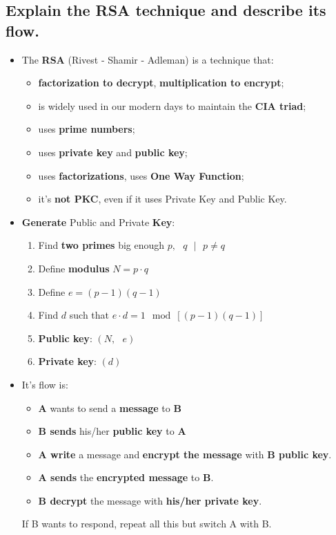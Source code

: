\documentclass[9pt, letterpaper]{article}
\begin{document}
\subsection{Explain the RSA technique and describe its flow.}
\begin{itemize}
	\item The \textbf{RSA} (Rivest - Shamir - Adleman) is a technique that:
	\begin{itemize}
		\item \textbf{factorization to decrypt}, \textbf{multiplication to encrypt};
		\item is widely used in our modern days to maintain the \textbf{CIA triad};
		\item uses \textbf{prime numbers};
		\item uses \textbf{private key} and \textbf{public key};
		\item uses \textbf{factorizations}, uses \textbf{One Way Function};
		\item it's \textbf{not PKC}, even if it uses Private Key and Public Key.
	\end{itemize}
	\item \textbf{Generate} Public and Private \textbf{Key}:
	\begin{enumerate}
		\item Find \textbf{two primes} big enough $p,\mbox{ }q \mbox{ }|\mbox{ } p\ne q$
		\item Define \textbf{modulus} $N= p \cdot q$
		\item Define $e= (p-1)(q-1)$
		\item Find $d$ such that $e \cdot d = 1 \mod [(p-1)(q-1)]$
		\item \textbf{Public key}: $(N,\mbox{ }e)$
		\item \textbf{Private key}: $(d)$
	\end{enumerate}
	\item It's flow is:
	\begin{itemize}
		\item \textbf{A} wants to send a \textbf{message} to \textbf{B}
		\item \textbf{B sends} his/her \textbf{public key} to \textbf{A}
		\item \textbf{A write} a message and \textbf{encrypt the message} with \textbf{B public key}.
		\item \textbf{A sends} the \textbf{encrypted message} to \textbf{B}.
		\item \textbf{B decrypt} the message with \textbf{his/her private key}.
	\end{itemize}
	If B wants to respond, repeat all this but switch A with B.
\end{itemize}
\end{document}
